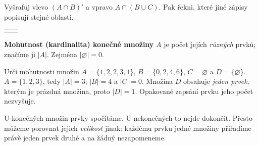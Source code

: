 \documentclass[11pt,a4paper]{article}
\newcommand{\vennDve}[1]{%
\begin{tikzpicture}[scale=.68,baseline=(current bounding box.center)]
  \path[use as bounding box] (-2.72,-1.83) rectangle (2.72,1.79);
  #1
  \draw[thick] (-2.57,-1.63) rectangle (2.57,1.65);
  \draw[thick] (-.78,0) circle (1.25);
  \draw[thick] (.78,0) circle (1.25);
  \node at (-2.32,.15) {$A$}; \node at (2.32,.15) {$B$};
  \node[anchor=north east] at (2.49,1.56) {$U$};
\end{tikzpicture}}
\newcommand{\vennTri}[1]{%
\begin{tikzpicture}[scale=.68,baseline=(current bounding box.center)]
  \path[use as bounding box] (-2.72,-2.45) rectangle (2.72,2.05);
  #1
  \draw[thick] (-2.6,-2.35) rectangle (2.6,1.94);
  \draw[thick] (-.86,.37) circle (1.35);
  \draw[thick] (.86,.37) circle (1.35);
  \draw[thick] (0,-.76) circle (1.35);
  \node at (-2.35,.19) {$A$}; \node at (2.35,.19) {$B$};
  \node at (0,-2.24) {$C$};
  \node[anchor=north east] at (2.5,1.84) {$U$};
\end{tikzpicture}}
\begin{document}

Vyšrafuj vlevo $(A\cap B)'$ a vpravo $A\cap(B\cup C)$.
Pak řekni, které jiné zápisy popisují stejné oblasti.
\begin{center}
\begin{tabularx}{\linewidth}{@{}XX@{}}
\centering\vennDve{} & \centering\vennTri{}\tabularnewline
\end{tabularx}
\end{center}

\clearpage
{}

\begin{definiceBox}[title={Definice - Mohutnost konečné množiny}]
\textbf{Mohutnost (kardinalita) konečné množiny} $A$ je počet jejích
\emph{různých} prvků; značíme ji $|A|$. Zejména $|\varnothing|=0$.
\end{definiceBox}

\begin{prikladReseniBox}[title={Příklad 4}]
Urči mohutnosti množin
$A=\{1,2,2,3,1\}$, $B=\{0,2,4,6\}$,
$C=\varnothing$ a $D=\{\varnothing\}$.
\tcblower
$A=\{1,2,3\}$, tedy $|A|=3$; $|B|=4$ a $|C|=0$.
Množina $D$ obsahuje \emph{jeden prvek}, kterým je prázdná množina,
proto $|D|=1$. Opakované zapsání prvku jeho počet nezvyšuje.
\end{prikladReseniBox}

U konečných množin prvky spočítáme. U nekonečných to nejde dokončit.
Přesto můžeme porovnat jejich \emph{velikost} jinak: každému prvku jedné
množiny přiřadíme právě jeden prvek druhé a na žádný nezapomeneme.
\end{document}
